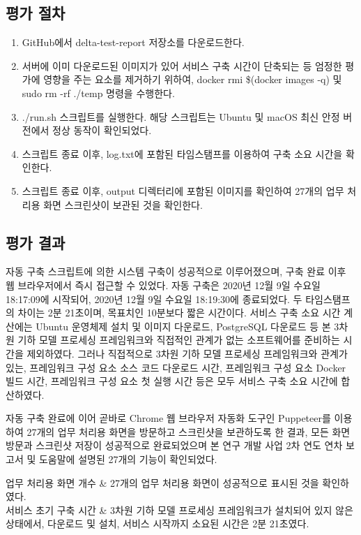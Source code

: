 \documentclass[11pt,oneside,openany,itemph,a4paper,chapter]{oblivoir}
\newenvironment{tablekeyvalue}[2]
{\bgroup
\table[H] \tabularx{\linewidth}{|
>{\setlength{\baselineskip}{1.2\baselineskip}}P{#1\linewidth}|
>{\setlength{\baselineskip}{1.2\baselineskip}}P{#2\linewidth}|}
\hline}
{\endtabularx \endtable \egroup}
\begin{document}
\subsection{평가 절차}
\begin{enumerate}
    \item GitHub에서 delta-test-report 저장소를 다운로드한다.
    \item 서버에 이미 다운로드된 이미지가 있어 서비스 구축 시간이 단축되는 등 엄정한 평가에 영향을 주는 요소를 제거하기 위하여, docker rmi \$(docker images -q) 및 sudo rm -rf ./temp 명령을 수행한다.
    \item ./run.sh 스크립트를 실행한다. 해당 스크립트는 Ubuntu 및 macOS 최신 안정 버전에서 정상 동작이 확인되었다.
    \item 스크립트 종료 이후, log.txt에 포함된 타임스탬프를 이용하여 구축 소요 시간을 확인한다.
    \item 스크립트 종료 이후, output 디렉터리에 포함된 이미지를 확인하여 27개의 업무 처리용 화면 스크린샷이 보관된 것을 확인한다.
\end{enumerate}

\subsection{평가 결과}
자동 구축 스크립트에 의한 시스템 구축이 성공적으로 이루어졌으며, 구축 완료 이후 웹 브라우저에서 즉시 접근할 수 있었다. 자동 구축은 2020년 12월 9일 수요일 18:17:09에 시작되어, 2020년 12월 9일 수요일 18:19:30에 종료되었다. 두 타임스탬프의 차이는 2분 21초이며, 목표치인 10분보다 짧은 시간이다. 서비스 구축 소요 시간 계산에는 Ubuntu 운영체제 설치 및 이미지 다운로드, PostgreSQL 다운로드 등 본 3차원 기하 모델 프로세싱 프레임워크와 직접적인 관계가 없는 소프트웨어를 준비하는 시간을 제외하였다. 그러나 직접적으로 3차원 기하 모델 프로세싱 프레임워크와 관계가 있는, 프레임워크 구성 요소 소스 코드 다운로드 시간, 프레임워크 구성 요소 Docker 빌드 시간, 프레임워크 구성 요소 첫 실행 시간 등은 모두 서비스 구축 소요 시간에 합산하였다.

자동 구축 완료에 이어 곧바로 Chrome 웹 브라우저 자동화 도구인 Puppeteer를 이용하여 27개의 업무 처리용 화면을 방문하고 스크린샷을 보관하도록 한 결과, 모든 화면 방문과 스크린샷 저장이 성공적으로 완료되었으며 본 연구 개발 사업 2차 연도 연차 보고서 및 도움말에 설명된 27개의 기능이 확인되었다.

\begin{tablekeyvalue}{0.3}{0.7}
    업무 처리용 화면 개수 & 27개의 업무 처리용 화면이 성공적으로 표시된 것을 확인하였다. \\ \hline
    서비스 초기 구축 시간 & 3차원 기하 모델 프로세싱 프레임워크가 설치되어 있지 않은 상태에서, 다운로드 및 설치, 서비스 시작까지 소요된 시간은 2분 21초였다. \\ \hline
\end{tablekeyvalue}
\end{document}
